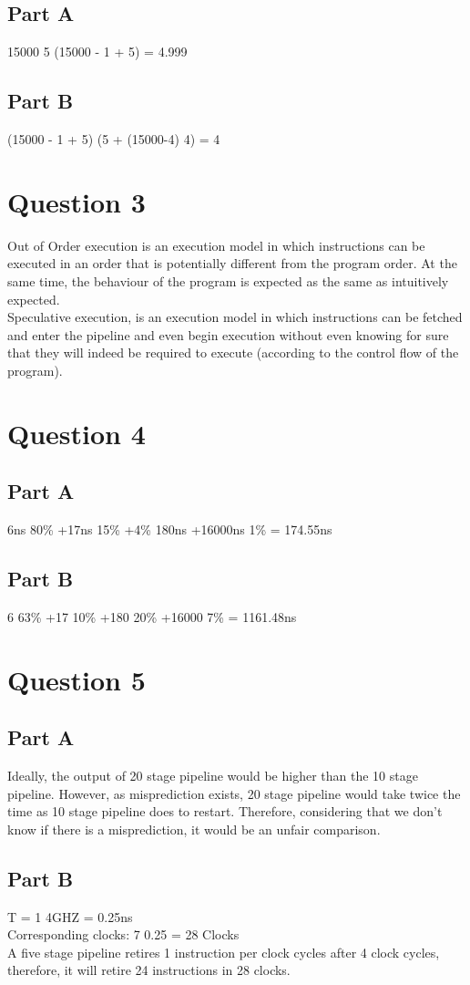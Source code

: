 \documentclass[11pt]{article}
\begin{document}
\subsection{Part A}
\label{sec:org3e24e9e}
15000 \texttimes{} 5 \textdiv{} (15000 - 1 + 5) = 4.999
\subsection{Part B}
\label{sec:orgba30943}
(15000 - 1 + 5) \textdiv{} (5 + (15000-4) \textdiv{} 4) = 4
\section{Question 3}
\label{sec:org8d31c46}
Out of Order execution is an execution model in which instructions can be executed in an order that is potentially different from the program order.
At the same time, the behaviour of the program is expected as the same as intuitively expected. \\

Speculative execution, is an execution model in which instructions can be fetched and enter the pipeline and even begin execution without 
even knowing for sure that they will indeed be required to execute (according to the control flow of the program).
\section{Question 4}
\label{sec:org6cc34c4}
\subsection{Part A}
\label{sec:org7728146}
6ns \texttimes{} 80\% +17ns \texttimes{} 15\% +4\% \texttimes{} 180ns +16000ns  \texttimes{}  1\% = 174.55ns
\subsection{Part B}
\label{sec:orgbd82c56}
6 \texttimes{} 63\% +17 \texttimes{} 10\% +180 \texttimes{} 20\% +16000 \texttimes{} 7\% = 1161.48ns
\section{Question 5}
\label{sec:org151a0d9}
\subsection{Part A}
\label{sec:orgd069227}
Ideally, the output of 20 stage pipeline would be higher than the 10 stage pipeline. However, as misprediction exists, 20 stage pipeline would take twice the time as 10 stage pipeline does to restart.
Therefore, considering that we don’t know if there is a misprediction, it would be an unfair comparison.
\subsection{Part B}
\label{sec:orgb0bc944}
T = 1 \textdiv{} 4GHZ = 0.25ns \\
Corresponding clocks: 7 \textdiv{} 0.25 = 28 Clocks \\
A five stage pipeline retires 1 instruction per clock cycles after 4 clock cycles, therefore, it will retire 24 instructions in 28 clocks.
\end{document}
